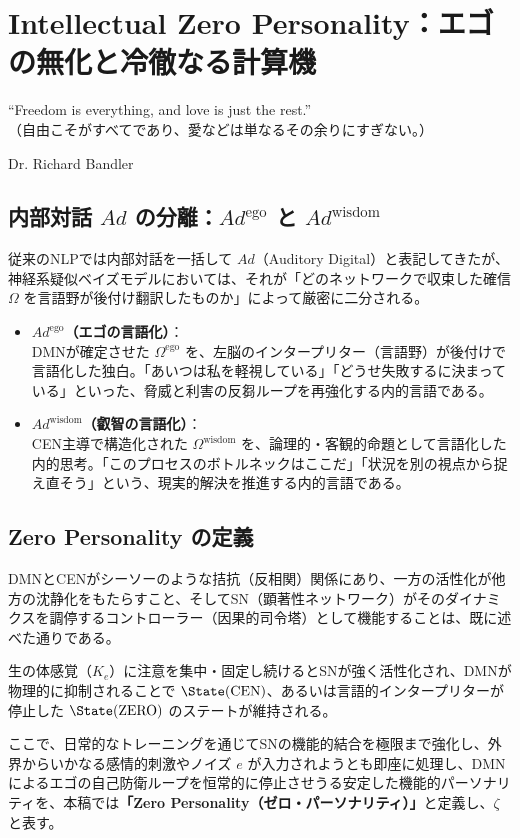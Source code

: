 \chapter{Intellectual Zero Personality：エゴの無化と冷徹なる計算機}
\epigraph{``Freedom is everything, and love is just the rest.''\\
（自由こそがすべてであり、愛などは単なるその余りにすぎない。）}{Dr. Richard Bandler}

\section{内部対話 $Ad$ の分離：$Ad^{\mathrm{ego}}$ と $Ad^{\mathrm{wisdom}}$}
従来のNLPでは内部対話を一括して $Ad$（Auditory Digital）と表記してきたが、神経系疑似ベイズモデルにおいては、それが「どのネットワークで収束した確信 $\Omega$ を言語野が後付け翻訳したものか」によって厳密に二分される。

\begin{itemize}
  \item \textbf{$Ad^{\mathrm{ego}}$（エゴの言語化）}：\\
  DMNが確定させた $\Omega^{\mathrm{ego}}$ を、左脳のインタープリター（言語野）が後付けで言語化した独白。「あいつは私を軽視している」「どうせ失敗するに決まっている」といった、脅威と利害の反芻ループを再強化する内的言語である。
  \item \textbf{$Ad^{\mathrm{wisdom}}$（叡智の言語化）}：\\
  CEN主導で構造化された $\Omega^{\mathrm{wisdom}}$ を、論理的・客観的命題として言語化した内的思考。「このプロセスのボトルネックはここだ」「状況を別の視点から捉え直そう」という、現実的解決を推進する内的言語である。
\end{itemize}


\section{Zero Personality の定義}
DMNとCENがシーソーのような拮抗（反相関）関係にあり、一方の活性化が他方の沈静化をもたらすこと、そしてSN（顕著性ネットワーク）がそのダイナミクスを調停するコントローラー（因果的司令塔）として機能することは、既に述べた通りである。

生の体感覚（$K_e$）に注意を集中・固定し続けるとSNが強く活性化され、DMNが物理的に抑制されることで $\State(\mathrm{CEN})$、あるいは言語的インタープリターが停止した $\State(\mathrm{ZERO})$ のステートが維持される。

ここで、日常的なトレーニングを通じてSNの機能的結合を極限まで強化し、外界からいかなる感情的刺激やノイズ $e$ が入力されようとも即座に処理し、DMNによるエゴの自己防衛ループを恒常的に停止させうる安定した機能的パーソナリティを、本稿では\textbf{「Zero Personality（ゼロ・パーソナリティ）」}と定義し、$\zeta$と表す。

